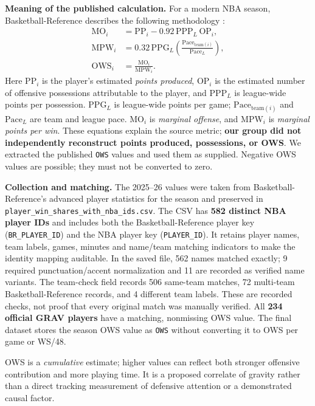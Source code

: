 \documentclass[11pt]{article}
\begin{document}
\textbf{Meaning of the published calculation.} For a modern NBA season,
Basketball-Reference describes the following methodology
\cite{winshares}:
\begin{align}
 \mathrm{MO}_i & = \mathrm{PP}_i - 0.92\,\mathrm{PPP}_{L}\,\mathrm{OP}_i,
 \label{eq:ows-marginal}\\
 \mathrm{MPW}_{i} & =0.32\,\mathrm{PPG}_{L}
 \left(\frac{\mathrm{Pace}_{\mathrm{team}(i)}}{\mathrm{Pace}_{L}}\right),
 \label{eq:ows-points}\\
 \mathrm{OWS}_i & = \frac{\mathrm{MO}_i}{\mathrm{MPW}_i}.
 \label{eq:ows-method}
\end{align}
Here $\mathrm{PP}_i$ is the player's estimated \emph{points produced},
$\mathrm{OP}_i$ is the estimated number of offensive possessions attributable
to the player, and $\mathrm{PPP}_{L}$ is league-wide points per possession.
$\mathrm{PPG}_{L}$ is league-wide points per game;
$\mathrm{Pace}_{\mathrm{team}(i)}$ and $\mathrm{Pace}_{L}$ are team and
league pace. $\mathrm{MO}_i$ is \emph{marginal offense}, and
$\mathrm{MPW}_i$ is \emph{marginal points per win}. These equations explain
the source metric; \textbf{our group did not independently reconstruct
points produced, possessions, or OWS}. We extracted the published \texttt{OWS}
values and used them as supplied. Negative OWS values are possible; they
must not be converted to zero.

\textbf{Collection and matching.} The 2025--26 values were taken from
Basketball-Reference's advanced player statistics for the season
\cite{br-advanced} and preserved in
\texttt{player\_win\_shares\_with\_nba\_ids.csv}. The CSV has
\textbf{582 distinct NBA player IDs} and includes both the
Basketball-Reference player key (\texttt{BR\_PLAYER\_ID}) and the NBA
player key (\texttt{PLAYER\_ID}). It retains player names, team labels,
games, minutes and name/team matching indicators to make the identity
mapping auditable. In the saved file, 562 names matched exactly; 9 required
punctuation/accent normalization and 11 are recorded as verified name
variants. The team-check field records 506 same-team matches, 72
multi-team Basketball-Reference records, and 4 different team labels.
These are recorded checks, not proof that every original match was
manually verified. All \textbf{234 official GRAV players} have a matching,
nonmissing OWS value. The final dataset stores the season OWS value as
\texttt{OWS} without converting it to OWS per game or WS/48.

OWS is a \emph{cumulative} estimate; higher values can reflect both stronger
offensive contribution and more playing time. It is a proposed correlate
of gravity rather than a direct tracking measurement of defensive
attention or a demonstrated causal factor.
\end{document}
